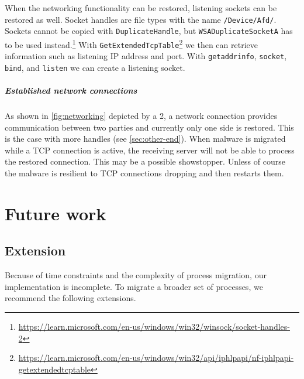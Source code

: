 \documentclass[a4paper, 11pt, english]{report}
\begin{document}
When the networking functionality can be restored, listening sockets can be restored as well.
Socket handles are file types with the name \texttt{/Device/Afd/}.
Sockets cannot be copied with \texttt{DuplicateHandle}, but \texttt{WSADuplicateSocketA} has to be used instead.\footnote{\url{https://learn.microsoft.com/en-us/windows/win32/winsock/socket-handles-2}}
With \texttt{GetExtendedTcpTable}\footnote{\url{https://learn.microsoft.com/en-us/windows/win32/api/iphlpapi/nf-iphlpapi-getextendedtcptable}} we then can retrieve information such as listening IP address and port. With \texttt{getaddrinfo}, \texttt{socket}, \texttt{bind}, and \texttt{listen} we can create a listening socket. 

\paragraph{Established network connections}
As shown in \autoref{fig:networking} depicted by a 2, a network connection provides communication between two parties and currently only one side is restored. This is the case with more handles (see \autoref{sec:other-end}). When malware is migrated while a TCP connection is active, the receiving server will not be able to process the restored connection. This may be a possible showstopper. Unless of course the malware is resilient to TCP connections dropping and then restarts them.



\chapter{Future work}
\label{ch:future-work}

\section{Extension}
Because of time constraints and the complexity of process migration, our implementation is incomplete. To migrate a broader set of processes, we recommend the following extensions.
\end{document}
